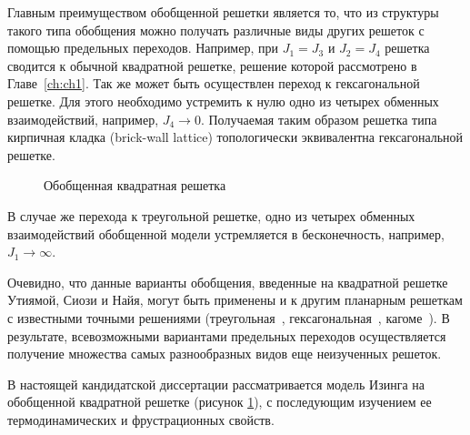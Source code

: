 Главным преимуществом обобщенной решетки является то, что из структуры такого типа обобщения можно получать различные виды других решеток с помощью предельных переходов. Например, при $J_1 = J_3$ и $J_2 = J_4$ решетка сводится к обычной квадратной решетке, решение которой рассмотрено в Главе~\ref{ch:ch1}. Так же может быть осуществлен переход к гексагональной решетке. Для этого необходимо устремить к нулю одно из четырех обменных взаимодействий, например, $J_4 \rightarrow 0$. Получаемая таким образом решетка типа \guillemotleft кирпичная кладка\guillemotright$ $ (brick-wall lattice) %
топологически эквивалентна гексагональной решетке.

 \begin{figure}[h]
 	\caption{Обобщенная квадратная решетка}
 	\label{genSquare}
 \end{figure}
 
В случае же перехода к треугольной решетке, одно из четырех обменных взаимодействий обобщенной модели устремляется в бесконечность, например, $J_1 \rightarrow \infty$.%

Очевидно, что данные варианты обобщения, введенные на квадратной решетке Утиямой, Сиози и Найя, могут быть применены и к другим планарным решеткам с известными точными решениями (треугольная~\cite{wannier1950}, гексагональная~\cite{houtapell1950}, кагоме~\cite{kano_naya1953}). В результате, всевозможными вариантами предельных переходов осуществляется получение множества самых разнообразных видов еще неизученных решеток.

%

В настоящей кандидатской диссертации рассматривается модель Изинга на обобщенной квадратной решетке (рисунок \ref{genSquare}), с последующим изучением ее термодинамических и фрустрационных свойств. 


